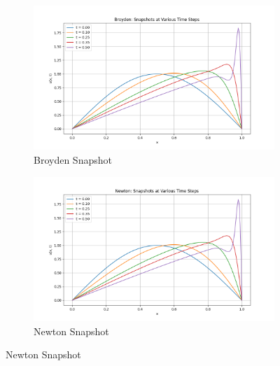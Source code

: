 \documentclass[12pt]{article}
\begin{document}
\begin{figure}[H]
  \centering

  \begin{subfigure}[b]{0.6\textwidth}
    \includegraphics[width=\textwidth]{Broyden_snapshots.png}
    \caption{Broyden Snapshot}
    \label{fig:broyden_snapshot}
  \end{subfigure}
  \hfill
  \begin{subfigure}[b]{0.6\textwidth}
    \includegraphics[width=\textwidth]{Newton_snapshots.png}
    \caption{Newton Snapshot}
    \label{fig:newton_snapshot}
  \end{subfigure}

  \vspace{0.5cm}


\end{figure}
\end{document}
